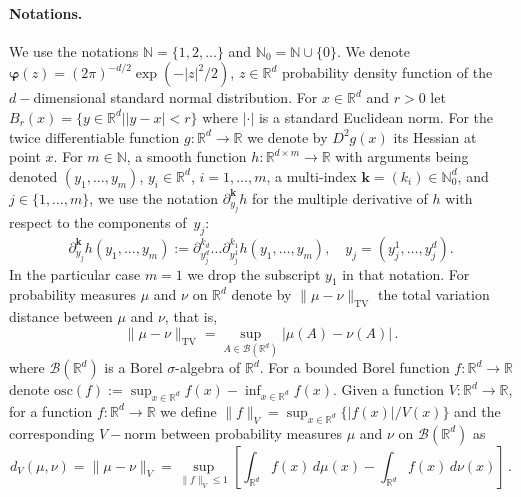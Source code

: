 \documentclass[bj]{imsart}
\def\nset{\mathbb{N}}
\def\rset{\mathbb{R}}
\def\rset{\mathbb{R}}
\newcommand{\tvnorm}[1]{\| #1 \|_{\operatorname{TV}}}
\def\eqsp{\,}
\begin{document}
\paragraph{Notations. }\label{par:notations}
We use the notations $\nset=\{1,2,\ldots\}$ and $\nset_0=\mathbb N\cup\{0\}$. We denote $\boldsymbol{\varphi}(z)=(2\pi)^{-d/2} \exp(-|z|^2/2)$, $z\in\mathbb R^d$ probability density function of the $d-$dimensional standard normal distribution. For $x \in \rset^d$ and $r>0$ let $B_r(x) = \{y \in \rset^d | |y - x| < r\}$ where $|\cdot|$ is a standard Euclidean norm. For the twice differentiable function $g: \rset^d \rightarrow \rset$ we denote by $D^2g(x)$ its Hessian at point $x$. For $m\in\mathbb N$, a smooth function
$h\colon\mathbb R^{d\times m}\to\mathbb R$
with arguments being denoted
$(y_1,\ldots,y_m)$, $y_i\in\mathbb R^d$, $i=1,\ldots,m$,
a multi-index $\mathbf k=(k_i)\in\mathbb N_0^d$,
and $j\in\{1,\ldots,m\}$,
we use the notation $\partial^{\mathbf k}_{y_j} h$ for the multiple derivative of $h$
with respect to the components of~$y_j$:
\[
\partial^{\mathbf k}_{y_j} h(y_1,\ldots,y_m)
:=\partial^{k_d}_{y_j^d}
\ldots
\partial^{k_1}_{y_j^1}
h(y_1,\ldots,y_m),
\quad y_j=(y_j^1,\ldots,y_j^d).
\]
In the particular case $m=1$ we drop the subscript $y_1$ in that notation. For probability measures $\mu$ and $\nu$ on $\rset^d$ denote by $\tvnorm{\mu-\nu}$ the total variation distance between $\mu$ and $\nu$, that is,
\[
\tvnorm{\mu-\nu}=\sup_{A \in \mathcal{B}(\rset^d)}
|\mu(A)-\nu(A)| \eqsp.
\]
where $\mathcal{B}(\rset^d)$ is a Borel $\sigma$-algebra of $\rset^d$. For a bounded Borel function $f: \rset^d \rightarrow \rset$ denote $\mathrm{osc}(f):=\sup_{x\in\mathbb R^d}f(x)-\inf_{x\in\mathbb R^d}f(x)$. Given a function $V: \rset^d \rightarrow \rset$, for a function $f: \rset^d \rightarrow \rset$ we define $\|f\|_{V} = \sup_{x \in \rset^d} \{|f(x)|/V(x)\}$ and the corresponding $V-$norm between probability measures $\mu$ and $\nu$ on $\mathcal{B}(\rset^d)$ as
\[
d_V(\mu, \nu) = \|\mu - \nu\|_{V} = \sup_{\|f\|_{V} \leq 1} \left[\int\nolimits_{\rset^d}f(x)\,d\mu(x) - \int\nolimits_{\rset^d}f(x)\,d\nu(x)\right]  \eqsp.
\]
\end{document}
